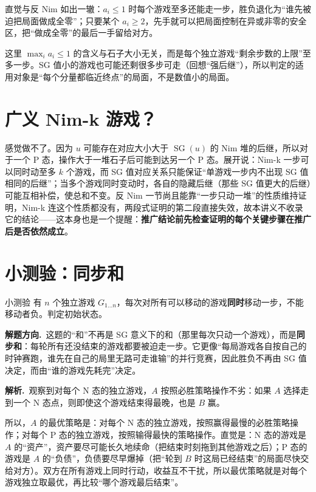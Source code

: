 \documentclass[UTF8,a4paper,11pt,oneside,openany,fontset=fandol]{ctexbook}
\theoremstyle{definition}
\newcommand{\SG}{\operatorname{SG}}
\newcommand{\sol}{\par\noindent\textbf{解析.}\ }
\newcommand{\hint}{\par\noindent\textbf{解题方向.}\ }
\begin{document}
直觉与反 Nim 如出一辙：$a_i\le1$ 时每个游戏至多还能走一步，胜负退化为“谁先被迫把局面做成全零”；只要某个 $a_i\ge2$，先手就可以把局面控制在异或非零的安全区，把“做成全零”的最后一手留给对方。

\begin{pitfall}
这里 $\max_i a_i\le1$ 的含义与石子大小无关，而是每个独立游戏“剩余步数的上限”至多一步。SG 值小的游戏也可能还剩很多步可走（回想“强后继”），所以判定的适用对象是“每个分量都临近终点”的局面，不是数值小的局面。
\end{pitfall}

\section{广义 Nim-k 游戏？}
感觉做不了。因为 $u$ 可能存在对应大小大于 $\SG(u)$ 的 Nim 堆的后继，所以对于一个 P 态，操作大于一堆石子后可能到达另一个 P 态。展开说：Nim-k 一步可以同时动至多 $k$ 个游戏，而 SG 值对应关系只能保证“单游戏一步内不出现 SG 值相同的后继”；当多个游戏同时变动时，各自的隐藏后继（那些 SG 值更大的后继）可能互相补偿，使总和不变。反 Nim 一节尚且能靠“一步只动一堆”的性质维持证明，Nim-k 连这个性质都没有，两段式证明的第二段直接失效，故本讲义不收录它的结论——这本身也是一个提醒：\textbf{推广结论前先检查证明的每个关键步骤在推广后是否依然成立}。

\section{小测验：同步和}
\begin{problem}{小测验}
有 $n$ 个独立游戏 $G_{1\ldots n}$，每次对所有可以移动的游戏\textbf{同时}移动一步，不能移动者负。判定初始状态。
\end{problem}

\hint 这题的“和”不再是 SG 意义下的和（那里每次只动一个游戏），而是\textbf{同步和}：每轮所有还没结束的游戏都要被迫走一步。它更像“每局游戏各自按自己的时钟赛跑，谁先在自己的局里无路可走谁输”的并行竞赛，因此胜负不再由 SG 值决定，而由“谁的游戏先耗完”决定。

\sol 观察到对每个 N 态的独立游戏，$A$ 按照必胜策略操作不劣：如果 $A$ 选择走到一个 N 态点，则即使这个游戏结束得最晚，也是 $B$ 赢。

所以，$A$ 的最优策略是：对每个 N 态的独立游戏，按照赢得最慢的必胜策略操作；对每个 P 态的独立游戏，按照输得最快的策略操作。直觉是：N 态的游戏是 $A$ 的“资产”，资产要尽可能长久地续命（把结束时刻拖到其他游戏之后）；P 态的游戏是 $A$ 的“负债”，负债要尽早爆掉（把“轮到 $B$ 时这局已经结束”的局面尽快交给对方）。双方在所有游戏上同时行动，收益互不干扰，所以最优策略就是对每个游戏独立取最优，再比较“哪个游戏最后结束”。
\end{document}
